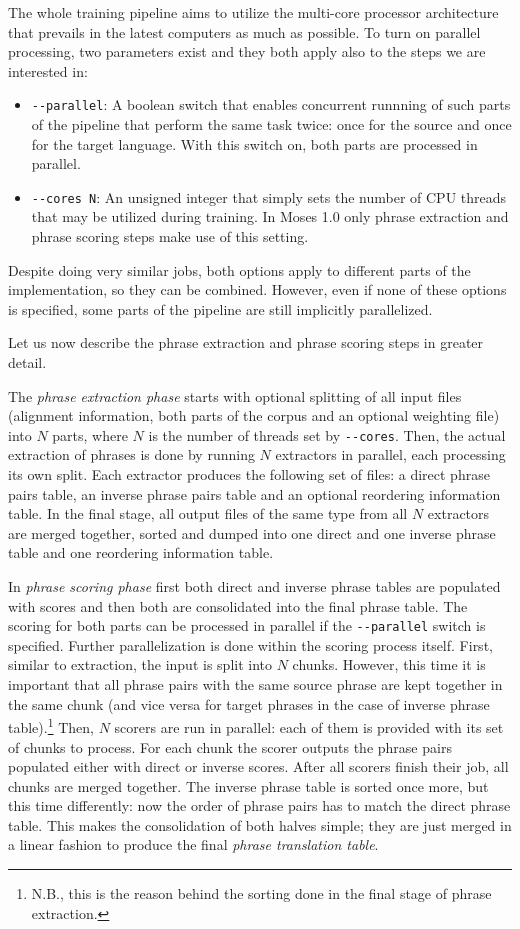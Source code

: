 The whole training pipeline aims to utilize the multi-core processor architecture that
prevails in the latest computers as much as possible. To turn on parallel processing,
two parameters exist and they both apply also to the steps we are interested in:
\begin{itemize}
  \item \verb|--parallel|: A boolean switch that enables concurrent runnning of such parts of
  the pipeline that perform the same task twice: once for the source and once for the target language.
  With this switch on, both parts are processed in parallel.
  \item \verb|--cores N|: An unsigned integer that simply sets the number of CPU threads
  that may be utilized during training. In Moses 1.0 only phrase extraction and phrase
  scoring steps make use of this setting.
\end{itemize}
Despite doing very similar jobs, both options apply to different parts
of the implementation, so they can be combined.
However, even if none of these options is specified, some parts of the pipeline
are still implicitly parallelized.

Let us now describe the phrase extraction and phrase scoring steps in greater detail.

The \emph{phrase extraction phase} starts with optional splitting of all input files
(alignment information, both parts of the corpus and an optional weighting file) into $N$
parts, where $N$ is the number of threads set by \verb|--cores|.
Then, the actual extraction of phrases is done by running $N$ extractors in parallel,
each processing its own split.
Each extractor produces the following set of files: a direct phrase pairs table, an inverse
phrase pairs table and an optional reordering information table.
In the final stage, all output files of the same type from all $N$ extractors are
merged together, sorted and dumped into one direct and one inverse phrase table
and one reordering information table.

In \emph{phrase scoring phase} first both direct and inverse phrase tables are
populated with scores and then both are consolidated into the final phrase table.
The scoring for both parts can be processed in parallel if the \verb|--parallel|
switch is specified.
Further parallelization is done within the scoring process itself.
First, similar to extraction, the input is split into $N$ chunks.
However, this time it is important that all phrase pairs with the same source
phrase are kept together in the same chunk (and vice versa for target phrases
in the case of inverse phrase table).\footnote{N.B., this is the reason behind
the sorting done in the final stage of phrase extraction.}
Then, $N$ scorers are run in parallel: each of them is provided with its set
of chunks to process.
For each chunk the scorer outputs the phrase pairs populated either with direct
or inverse scores.
After all scorers finish their job, all chunks are merged together.
The inverse phrase table is sorted once more, but this time differently:
now the order of phrase pairs has to match the direct phrase table.
This makes the consolidation of both halves simple; they are just merged
in a linear fashion to produce the final \emph{phrase translation table}.

